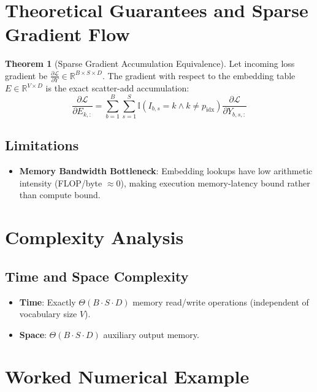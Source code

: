 \documentclass[11pt,a4paper]{article}
\theoremstyle{definition}
\newtheorem{theorem}{Theorem}[section]
\begin{document}
\section{Theoretical Guarantees and Sparse Gradient Flow}

\begin{theorem}[Sparse Gradient Accumulation Equivalence]
Let incoming loss gradient be $\frac{\partial \mathcal{L}}{\partial Y} \in \mathbb{R}^{B \times S \times D}$. The gradient with respect to the embedding table $E \in \mathbb{R}^{V \times D}$ is the exact scatter-add accumulation:
\begin{equation}
\frac{\partial \mathcal{L}}{\partial E_{k, :}} = \sum_{b=1}^B \sum_{s=1}^S \mathbb{I}(I_{b, s} = k \land k \ne p_{\text{idx}}) \frac{\partial \mathcal{L}}{\partial Y_{b, s, :}}
\end{equation}
\end{theorem}

\subsection{Limitations}
\begin{itemize}
    \item \textbf{Memory Bandwidth Bottleneck}: Embedding lookups have low arithmetic intensity (FLOP/byte $\approx 0$), making execution memory-latency bound rather than compute bound.
\end{itemize}

\section{Complexity Analysis}

\subsection{Time and Space Complexity}
\begin{itemize}
    \item \textbf{Time}: Exactly $\Theta(B \cdot S \cdot D)$ memory read/write operations (independent of vocabulary size $V$).
    \item \textbf{Space}: $\Theta(B \cdot S \cdot D)$ auxiliary output memory.
\end{itemize}

\section{Worked Numerical Example}
\end{document}
